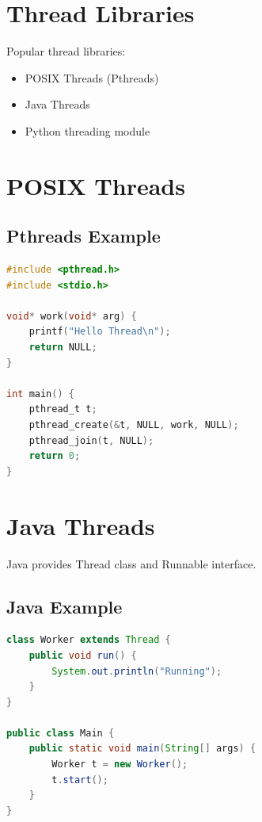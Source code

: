 \section{Thread Libraries}

Popular thread libraries:

\begin{itemize}
\item POSIX Threads (Pthreads)
\item Java Threads
\item Python threading module
\end{itemize}

\section{POSIX Threads}

\subsection{Pthreads Example}

\begin{lstlisting}[language=C,style=interviewcode]
#include <pthread.h>
#include <stdio.h>

void* work(void* arg) {
    printf("Hello Thread\n");
    return NULL;
}

int main() {
    pthread_t t;
    pthread_create(&t, NULL, work, NULL);
    pthread_join(t, NULL);
    return 0;
}
\end{lstlisting}

\section{Java Threads}

Java provides Thread class and Runnable interface.

\subsection{Java Example}

\begin{lstlisting}[language=Java,style=interviewcode]
class Worker extends Thread {
    public void run() {
        System.out.println("Running");
    }
}

public class Main {
    public static void main(String[] args) {
        Worker t = new Worker();
        t.start();
    }
}
\end{lstlisting}

